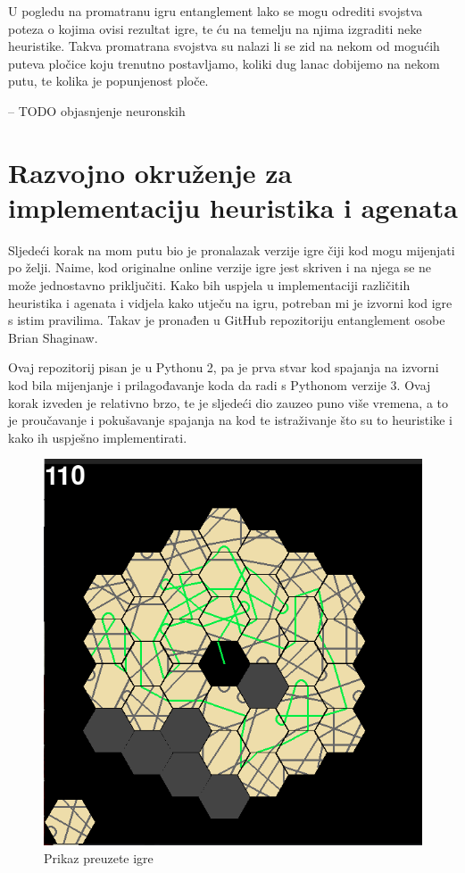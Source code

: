 \documentclass[zavrsnirad]{fer}
\begin{document}
U pogledu na promatranu igru entanglement lako se mogu odrediti svojstva poteza o kojima ovisi rezultat igre, te ću na temelju na njima izgraditi neke heuristike. Takva promatrana svojstva su nalazi li se zid na nekom od mogućih puteva pločice koju trenutno postavljamo, koliki dug lanac dobijemo na nekom putu, te kolika je popunjenost ploče. 


-- TODO objasnjenje neuronskih



\section{Razvojno okruženje za implementaciju heuristika i agenata}
\label{pog:razvojno_okruzenje}


Sljedeći korak na mom putu bio je pronalazak verzije igre čiji kod mogu mijenjati po želji. Naime, kod originalne online verzije igre jest skriven i na njega se ne može jednostavno priključiti. Kako bih uspjela u implementaciji različitih heuristika i agenata i vidjela kako utječu na igru, potreban mi je izvorni kod igre s istim pravilima. Takav je pronađen u GitHub repozitoriju \cite{entanglementgithub} entanglement osobe Brian Shaginaw.

Ovaj repozitorij pisan je u Pythonu 2, pa je prva stvar kod spajanja na izvorni kod bila mijenjanje i prilagođavanje koda da radi s Pythonom verzije 3. Ovaj korak izveden je relativno brzo, te je sljedeći dio zauzeo puno više vremena, a to je proučavanje i pokušavanje spajanja na kod te istraživanje što su to heuristike i kako ih uspješno implementirati. 

\begin{figure}[htb]
	\centering
	\includegraphics[width=0.58\linewidth]{Figures/gamefinished.png} 
	\caption{Prikaz preuzete igre}
	\label{slk:game_finished}
\end{figure}
\end{document}
